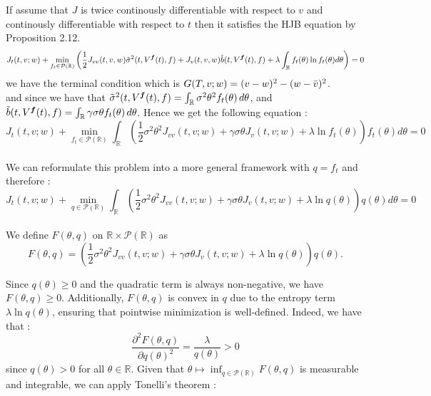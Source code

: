 \documentclass[oneside, a4paper, onecolumn, 11pt]{article}
\begin{document}
If assume that $J$ is twice continously differentiable with respect to $v$ and continously differentiable with respect to $t$ then it satisfies the HJB equation by Proposition 2.12. 
\begin{equation*}
   J_t(t,v; w) + \min_{f_t \in \mathcal{P}(\mathbb{R})} \left( \frac{1}{2} J_{vv}(t,v, w)\Tilde{\sigma}^2(t, V^{\boldsymbol{f}}(t), {f}) + J_v(t,v, w) \Tilde{b}(t, V^{\boldsymbol{f}}(t), f) + \lambda \int_{\mathbb{R}} f_t(\theta) \ln f_t(\theta) d\theta \right) = 0 
\end{equation*}
we have the terminal condition which is $G(T,v; w) = (v-w)^2 - (w -\Bar{v})^2$.\\
and since we have that $\Tilde{\sigma}^2(t, V^{\boldsymbol{f}}(t), {f})= \int_{\mathbb{R}} \sigma^2 \theta^2 f_t(\theta) \, d\theta$, and $\Tilde{b}(t, V^{\boldsymbol{f}}(t), {f}) = \int_{\mathbb{R}} \gamma \sigma \theta f_t(\theta) \, d\theta$.
Hence we get the following equation : 
\begin{equation}
J_t(t,v;w) + \min_{f_t \in \mathcal{P}(\mathbb{R})} \int_{\mathbb{R}} \left(\frac{1}{2} \sigma^2 \theta^2 J_{vv}(t,v; w) + \gamma \sigma \theta J_v(t,v; w)+\lambda \ln f_t(\theta) \right) f_t(\theta) d\theta = 0 \label{HJB:exploratory}
\end{equation}\\
We can reformulate this problem into a more general framework with $q=f_t$ and therefore  : 
\begin{equation}
J_t(t,v;w) + \min_{q \in \mathcal{P}(\mathbb{R})} \int_{\mathbb{R}} \left(\frac{1}{2} \sigma^2 \theta^2 J_{vv}(t,v; w) + \gamma \sigma \theta J_v(t,v; w)+\lambda \ln q(\theta) \right) q(\theta) d\theta = 0 \label{HJB:minimize}
\end{equation}\\

We define \( F(\theta, q) \) on \( \mathbb{R} \times \mathcal{P}(\mathbb{R}) \) as  
\begin{equation}
F(\theta, q) = \left( \frac{1}{2} \sigma^2 \theta^2 J_{vv}(t, v; w) + \gamma \sigma \theta J_v(t, v; w) + \lambda \ln q(\theta) \right) q(\theta).
\end{equation}

Since \( q(\theta) \geq 0 \) and the quadratic term is always non-negative, we have \( F(\theta, q) \geq 0 \). Additionally, \( F(\theta, q) \) is convex in \( q \) due to the entropy term \( \lambda \ln q(\theta) \), ensuring that pointwise minimization is well-defined. Indeed, we have that : 
\begin{equation}    
    \frac{\partial^2 F(\theta,q)}{\partial q(\theta)^2} = \frac{\lambda}{q(\theta)} > 0 
\end{equation}
since $q(\theta) > 0$ for all $\theta \in \mathbb{R}$.
Given that \( \theta \mapsto \inf_{q \in \mathcal{P}(\mathbb{R})} F(\theta, q) \) is measurable and integrable, we can apply Tonelli’s theorem :
\end{document}
